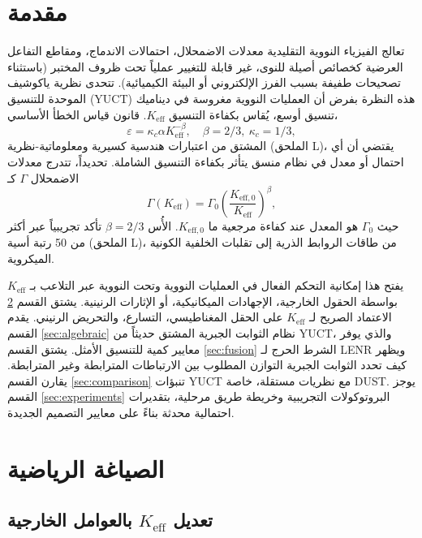 \documentclass[11pt,a4paper]{article}
\newcommand{\Keff}{K_{\mathrm{eff}}}
\newcommand{\Keffzero}{K_{\mathrm{eff},0}}
\theoremstyle{remark}
\begin{document}
	\section{مقدمة}
	\label{sec:intro}
	
	تعالج الفيزياء النووية التقليدية معدلات الاضمحلال، احتمالات الاندماج، ومقاطع التفاعل العرضية كخصائص أصيلة للنوى، غير قابلة للتغيير عملياً تحت ظروف المختبر (باستثناء تصحيحات طفيفة بسبب الفرز الإلكتروني أو البيئة الكيميائية). تتحدى نظرية ياكوشيف الموحدة للتنسيق (YUCT) هذه النظرة بفرض أن العمليات النووية مغروسة في ديناميك تنسيق أوسع، يُقاس بكفاءة التنسيق \(\Keff\). قانون قياس الخطأ الأساسي،
	\begin{equation}
		\varepsilon = \kappa_c \alpha \Keff^{-\beta}, \quad \beta = 2/3,\ \kappa_c = 1/3,
		\label{eq:universal-scaling}
	\end{equation}
	المشتق من اعتبارات هندسية كسيرية ومعلوماتية-نظرية (الملحق L)، يقتضي أن أي احتمال أو معدل في نظام منسق يتأثر بكفاءة التنسيق الشاملة. تحديداً، تتدرج معدلات الاضمحلال \(\Gamma\) كـ
	\begin{equation}
		\Gamma(\Keff) = \Gamma_0 \left( \frac{\Keffzero}{\Keff} \right)^{\beta},
		\label{eq:decay-rate}
	\end{equation}
	حيث \(\Gamma_0\) هو المعدل عند كفاءة مرجعية ما \(\Keffzero\). الأُس \(\beta = 2/3\) تأكد تجريبياً عبر أكثر من 50 رتبة أسية (الملحق L)، من طاقات الروابط الذرية إلى تقلبات الخلفية الكونية الميكروية.
	
	يفتح هذا إمكانية التحكم الفعال في العمليات النووية وتحت النووية عبر التلاعب بـ \(\Keff\) بواسطة الحقول الخارجية، الإجهادات الميكانيكية، أو الإثارات الرنينية. يشتق القسم \ref{sec:math} الاعتماد الصريح لـ \(\Keff\) على الحقل المغناطيسي، التسارع، والتحريض الرنيني. يقدم القسم \ref{sec:algebraic} نظام الثوابت الجبرية المشتق حديثاً من YUCT، والذي يوفر معايير كمية للتنسيق الأمثل. يشتق القسم \ref{sec:fusion} الشرط الحرج لـ LENR ويظهر كيف تحدد الثوابت الجبرية التوازن المطلوب بين الارتباطات المترابطة وغير المترابطة. يقارن القسم \ref{sec:comparison} تنبؤات YUCT مع نظريات مستقلة، خاصة DUST. يوجز القسم \ref{sec:experiments} البروتوكولات التجريبية وخريطة طريق مرحلية، بتقديرات احتمالية محدثة بناءً على معايير التصميم الجديدة.
	
	\section{الصياغة الرياضية}
	\label{sec:math}
	
	\subsection{تعديل \(\Keff\) بالعوامل الخارجية}
	
\end{document}
